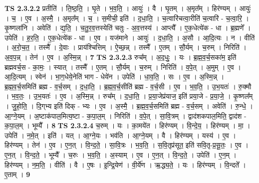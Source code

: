 \documentclass[17pt]{extarticle}
\begin{document}
                  \newline
                                \textbf{ TS 2.3.2.2} \newline
                  प्रतीति॑ । ति॒ष्ठ॒ति॒ । घृ॒ते । भ॒व॒ति॒ । आयुः॑ । वै । घृ॒तम् । अ॒मृत᳚म् । हिर॑ण्यम् । आयुः॑ । च॒ । ए॒व । अ॒स्मै॒ । अ॒मृत᳚म् । च॒ । स॒मीची॒ इति॑ । द॒धा॒ति॒ । च॒त्वारि॑चत्वा॒रीति॑ च॒त्वारि॑ - च॒त्वा॒रि॒ । कृ॒ष्णला॑नि । अवेति॑ । द्य॒ति॒ । च॒तु॒र॒व॒त्तस्येति॑ चतुः - अ॒व॒त्तस्य॑ । आप्त्यै᳚ । ए॒क॒धेत्ये॑क - धा । ब्र॒ह्मणे᳚ । उपेति॑ । ह॒र॒ति॒ । ए॒क॒धेत्ये॑क - धा । ए॒व । यज॑माने । आयुः॑ । द॒धा॒ति॒ । अ॒सौ । आ॒दि॒त्यः । न । वीति॑ । अ॒रो॒च॒त॒ । तस्मै᳚ । दे॒वाः । प्राय॑श्चित्तिम् । ऐ॒च्छ॒न्न् । तस्मै᳚ । ए॒तम् । सौ॒र्यम् । च॒रुम् । निरिति॑ । अ॒व॒प॒न्न् । तेन॑ । ए॒व । अ॒स्मि॒न्न् । \textbf{  7} \newline
                  \newline
                                \textbf{ TS 2.3.2.3} \newline
                  रुच᳚म् । अ॒द॒धुः॒ । यः । ब्र॒ह्म॒व॒र्च॒सका॑म॒ इति॑ ब्रह्मवर्च॒स - का॒मः॒ । स्यात् । तस्मै᳚ । ए॒तम् । सौ॒र्यम् । च॒रुम् । निरिति॑ । व॒पे॒त् । अ॒मुम् । ए॒व । आ॒दि॒त्यम् । स्वेन॑ । भा॒ग॒धेये॒नेति॑ भाग - धेये॑न । उपेति॑ । धा॒व॒ति॒ । सः । ए॒व । अ॒स्मि॒न्न् । ब्र॒ह्म॒व॒र्च॒समिति॑ ब्रह्म - व॒र्च॒सम् । द॒धा॒ति॒ । ब्र॒ह्म॒व॒र्च॒सीति॑ ब्रह्म - व॒र्च॒सी । ए॒व । भ॒व॒ति॒ । उ॒भ॒यतः॑ । रु॒क्मौ । भ॒व॒तः॒ । उ॒भ॒यतः॑ । ए॒व । अ॒स्मि॒न्न् । रुच᳚म् । द॒धा॒ति॒ । प्र॒या॒जेप्र॑याज॒ इति॑ प्रया॒जे - प्र॒या॒जे॒ । कृ॒ष्णल᳚म् । जु॒हो॒ति॒ । दि॒ग्‌भ्य इति॑ दिक् - भ्यः । ए॒व । अ॒स्मै॒ । ब्र॒ह्म॒व॒र्च॒समिति॑ ब्रह्म - व॒र्च॒सम् । अवेति॑ । रु॒न्धे॒ । आ॒ग्ने॒यम् । अ॒ष्टाक॑पाल॒मित्य॒ष्टा - क॒पा॒ल॒म् । निरिति॑ । व॒पे॒त् । सा॒वि॒त्रम् । द्वाद॑शकपाल॒मिति॒ द्वाद॑श - क॒पा॒ल॒म् । भूम्यै᳚ । \textbf{  8} \newline
                  \newline
                                \textbf{ TS 2.3.2.4} \newline
                  च॒रुम् । यः । का॒मये॑त । हिर॑ण्यम् । वि॒न्दे॒य॒ । हिर॑ण्यम् । मा॒ । उपेति॑ । न॒मे॒त् । इति॑ । यत् । आ॒ग्ने॒यः । भव॑ति । आ॒ग्ने॒यम् । वै । हिर॑ण्यम् । यस्य॑ । ए॒व । हिर॑ण्यम् । तेन॑ । ए॒व । ए॒न॒त् । वि॒न्द॒ते॒ । सा॒वि॒त्रः । भ॒व॒ति॒ । स॒वि॒तृप्र॑सूत॒ इति॑ सवि॒तृ-प्र॒सू॒तः॒ । ए॒व । ए॒न॒त् । वि॒न्द॒ते॒ । भूम्यै᳚ । च॒रुः । भ॒व॒ति॒ । अ॒स्याम् । ए॒व । ए॒न॒त् । वि॒न्द॒ते॒ । उपेति॑ । ए॒न॒म् । हिर॑ण्यम् । न॒म॒ति॒ । वीति॑ । वै । ए॒षः । इ॒न्द्रि॒येण॑ । वी॒र्ये॑ण । ऋ॒द्ध्य॒ते॒ । यः । हिर॑ण्यम् । वि॒न्दते᳚ । ए॒ताम् । \textbf{  9} \newline
                  \newline
\end{document}
